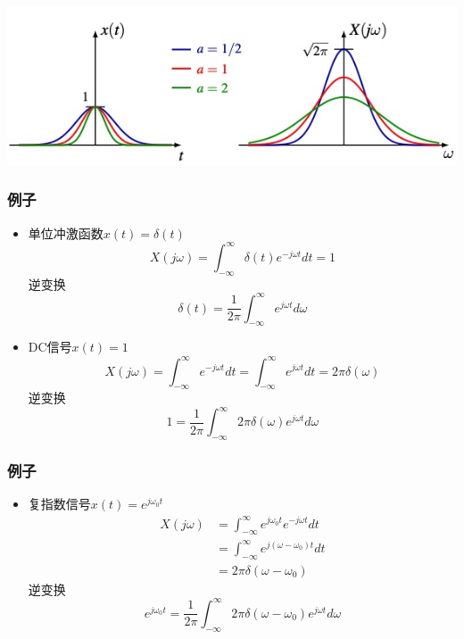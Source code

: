 \documentclass[CJKutf8,dvipsnames,table]{beamer}
\begin{document}
\begin{CJK*}{UTF8}{song}
\begin{frame}
\begin{itemize}
    	\begin{center}
      	\includegraphics[scale=.5]{ftgaussian}
    	\end{center}
    \end{itemize}

  \end{frame} 
       
  \begin{frame}
    \frametitle{例子}
    \begin{itemize}
    \item 单位冲激函数$x(t) = \delta(t)$
    \[
    	X(j\omega) = \int_{-\infty}^{\infty}\delta(t)e^{-j\omega t}dt = 1
    \]
    逆变换
    \[
    	\delta(t) = \frac{1}{2\pi}\int_{-\infty}^{\infty}e^{j\omega t}d\omega
    \]
    \item DC信号$x(t)=1$    
    \[
    	X(j\omega) = \int_{-\infty}^{\infty}e^{-j\omega t}dt = \int_{-\infty}^{\infty}e^{j\omega t}dt = 2\pi\delta(\omega)
    \]
    逆变换
    \[
    	1 = \frac{1}{2\pi}\int_{-\infty}^{\infty}2\pi\delta(\omega)e^{j\omega t}d\omega
    \]
    \end{itemize}

  \end{frame} 

  \begin{frame}
    \frametitle{例子}
    \begin{itemize}    
    \item 复指数信号$x(t)=e^{j\omega_0 t}$
        \begin{align*}
 		X(j\omega) & = \int_{-\infty}^{\infty}e^{j\omega_0 t}e^{-j\omega t}dt \\
		& = \int_{-\infty}^{\infty}e^{j(\omega-\omega_0) t}dt    \\
		& = 2\pi\delta(\omega-\omega_0)
    	\end{align*} 
	逆变换
    \[
    	e^{j\omega_0 t} = \frac{1}{2\pi}\int_{-\infty}^{\infty}2\pi\delta(\omega-\omega_0)e^{j\omega t}d\omega
    \]

    \end{itemize}


\end{frame}
\end{CJK*}
\end{document}
